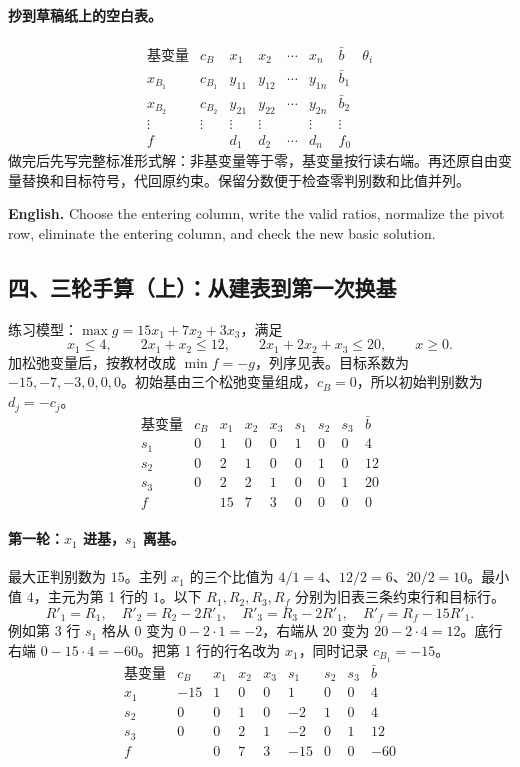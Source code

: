 \documentclass[UTF8,11pt,a4paper]{ctexart}
\newcommand{\EN}[1]{\par\noindent \textbf{English.} #1\par}
\begin{document}
\paragraph{抄到草稿纸上的空白表。}
\[
\begin{array}{c|r|cccc|r|c}
\text{基变量}&c_B&x_1&x_2&\cdots&x_n&\bar b&\theta_i\\\hline
x_{B_1}&c_{B_1}&y_{11}&y_{12}&\cdots&y_{1n}&\bar b_1&\\
x_{B_2}&c_{B_2}&y_{21}&y_{22}&\cdots&y_{2n}&\bar b_2&\\
\vdots&\vdots&\vdots&\vdots&&\vdots&\vdots&\\\hline
f&&d_1&d_2&\cdots&d_n&f_0&
\end{array}
\]
做完后先写完整标准形式解：非基变量等于零，基变量按行读右端。再还原自由变量替换和目标符号，代回原约束。保留分数便于检查零判别数和比值并列。
\EN{Choose the entering column, write the valid ratios, normalize the pivot row, eliminate the entering column, and check the new basic solution.}

\clearpage
\subsection*{四、三轮手算（上）：从建表到第一次换基}
\noindent 练习模型：$\max g=15x_1+7x_2+3x_3$，满足
\[
x_1\le4,\qquad 2x_1+x_2\le12,\qquad 2x_1+2x_2+x_3\le20,\qquad x\ge0.
\]
加松弛变量后，按教材改成 $\min f=-g$，列序见表。目标系数为 $-15,-7,-3,0,0,0$。初始基由三个松弛变量组成，$c_B=0$，所以初始判别数为 $d_j=-c_j$。
\[
\begin{array}{c|r|rrrrrr|r}
\text{基变量}&c_B&x_1&x_2&x_3&s_1&s_2&s_3&\bar b\\\hline
s_1&0&1&0&0&1&0&0&4\\
s_2&0&2&1&0&0&1&0&12\\
s_3&0&2&2&1&0&0&1&20\\
\hline
f&&15&7&3&0&0&0&0
\end{array}
\]
\paragraph{第一轮：$x_1$ 进基，$s_1$ 离基。}
最大正判别数为 $15$。主列 $x_1$ 的三个比值为 $4/1=4$、$12/2=6$、$20/2=10$。最小值 $4$，主元为第 1 行的 $1$。以下 $R_1,R_2,R_3,R_f$ 分别为旧表三条约束行和目标行。
\[
 R'_1=R_1,\quad R'_2=R_2-2R'_1,\quad R'_3=R_3-2R'_1,\quad R'_f=R_f-15R'_1.
\]
例如第 3 行 $s_1$ 格从 $0$ 变为 $0-2\cdot1=-2$，右端从 $20$ 变为 $20-2\cdot4=12$。底行右端 $0-15\cdot4=-60$。把第 1 行的行名改为 $x_1$，同时记录 $c_{B_1}=-15$。
\[
\begin{array}{c|r|rrrrrr|r}
\text{基变量}&c_B&x_1&x_2&x_3&s_1&s_2&s_3&\bar b\\\hline
x_1&-15&1&0&0&1&0&0&4\\
s_2&0&0&1&0&-2&1&0&4\\
s_3&0&0&2&1&-2&0&1&12\\
\hline
f&&0&7&3&-15&0&0&-60
\end{array}
\]
\end{document}
